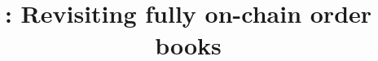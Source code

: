 \documentclass[envcountsect]{llncs}
\begin{document}
\frontmatter
\mainmatter

\title{\Large \bf \cm: Revisiting fully on-chain order books}




\maketitle











\clearpage



\clearpage
\appendix

\end{document}
